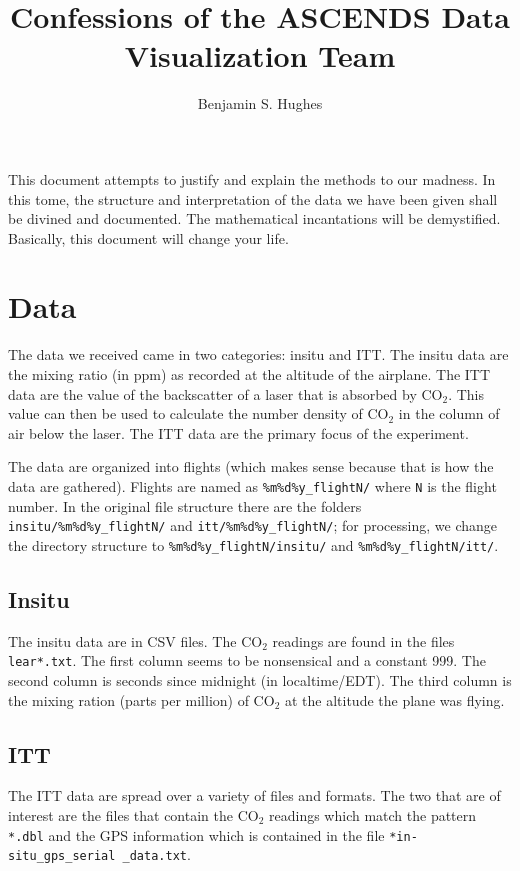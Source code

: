 \documentclass[12pt]{article}
\begin{document}
\author{Benjamin S. Hughes}
\title{Confessions of the ASCENDS Data Visualization Team}
\maketitle

This document attempts to justify and explain the methods to our madness.  In this tome, the structure and interpretation of the data we have been given shall be divined and documented.  The mathematical incantations will be demystified.  Basically, this document will change your life.

\section*{Data}

The data we received came in two categories: insitu and ITT.  The insitu data are the mixing ratio (in ppm) as recorded at the altitude of the airplane. The ITT data are the value of the backscatter of a laser that is absorbed by CO$_2$. This value can then be used to calculate the number density of CO$_2$ in the column of air below the laser.  The ITT data are the primary focus of the experiment.

The data are organized into flights (which makes sense because that is how the data are gathered).  Flights are named as \texttt{\%m\%d\%y\_flightN/} where \texttt{N} is the flight number.  In the original file structure there are the folders \texttt{insitu/\%m\%d\%y\_flightN/} and \texttt{itt/\%m\%d\%y\_flightN/}; for processing, we change the directory structure to \texttt{\%m\%d\%y\_flightN/insitu/} and \texttt{\%m\%d\%y\_flightN/itt/}.

\subsection*{Insitu}

The insitu data are in CSV files. The CO$_2$ readings are found in the files \texttt{lear*.txt}.  The first column seems to be nonsensical and a constant 999.  The second column is seconds since midnight (in localtime/EDT).  The third column is the mixing ration (parts per million) of CO$_2$ at the altitude the plane was flying.

\subsection*{ITT}

The ITT data are spread over a variety of files and formats.  The two that are of interest are the files that contain the CO$_2$ readings which match the pattern \texttt{*.dbl} and the GPS information which is contained in the file \texttt{*in-situ\_gps\_serial \_data.txt}.
\end{document}
